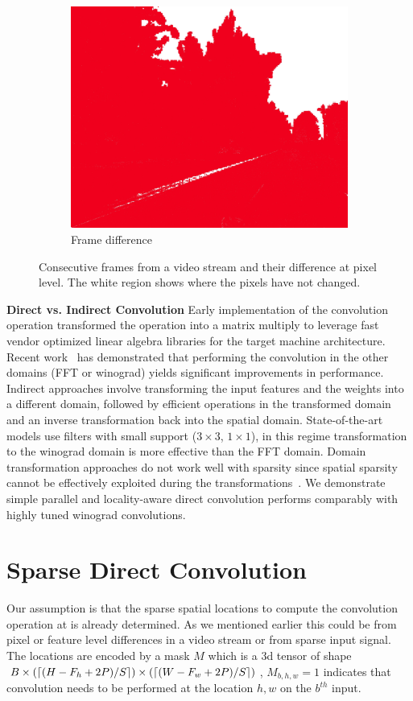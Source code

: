 \documentclass{article}
\begin{document}
\begin{figure}[h]
\begin{subfigure}{0.3\textwidth}
	\includegraphics[width=\textwidth]{diff.jpg}
	\caption{Frame difference}
\end{subfigure}
\caption{Consecutive frames from a video stream and their difference at pixel
    level. The white region shows where the pixels have not changed.}
\label{fig:frames}
\end{figure}

\textbf{Direct vs. Indirect Convolution} Early implementation of the convolution
operation transformed the operation into a matrix multiply to leverage fast
vendor optimized linear algebra libraries for the target machine architecture.
Recent work~\cite{vasilache2014fast, lavin2016fast} has demonstrated that
performing the convolution in the other domains (FFT or winograd) yields
significant improvements in performance.  Indirect approaches involve
transforming the input features and the weights into a different domain,
followed by efficient operations in the transformed domain and an inverse
transformation back into the spatial domain. State-of-the-art models use filters
with small support ($3 \times 3$, $1 \times 1$), in this regime transformation
to the winograd domain is more effective than the FFT domain. Domain
transformation approaches do not work well with sparsity since spatial sparsity
cannot be effectively exploited during the
transformations~\cite{liu2018efficient}.  We demonstrate simple parallel and
locality-aware direct convolution performs comparably with highly tuned winograd
convolutions.

\section{Sparse Direct Convolution}
Our assumption is that the sparse spatial locations to compute the convolution
operation at is already determined. As we mentioned earlier this could be from
pixel or feature level differences in a video stream or from sparse input
signal. The locations are encoded by a mask $M$ which is a 3d tensor of shape $B
\times (\lceil (H - F_h + 2P)/S \rceil) \times (\lceil (W - F_w + 2P)/S \rceil)$,
$M_{b,h,w} = 1$ indicates that convolution needs to be performed at the location
$h, w$ on the $b^{th}$ input. 
\end{document}
